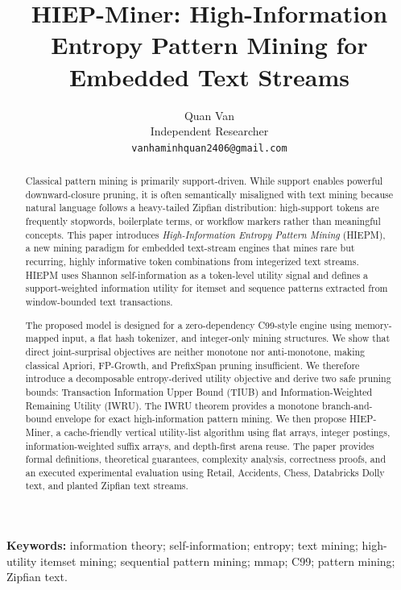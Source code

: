 \documentclass[11pt,a4paper]{article}
\title{\textbf{HIEP-Miner: High-Information Entropy Pattern Mining for Embedded Text Streams}}
\author{
Quan Van\\
Independent Researcher\\
\texttt{vanhaminhquan2406@gmail.com}
}
\date{}
\begin{document}
\maketitle

\begin{abstract}
Classical pattern mining is primarily support-driven. While support enables powerful downward-closure pruning, it is often semantically misaligned with text mining because natural language follows a heavy-tailed Zipfian distribution: high-support tokens are frequently stopwords, boilerplate terms, or workflow markers rather than meaningful concepts. This paper introduces \emph{High-Information Entropy Pattern Mining} (HIEPM), a new mining paradigm for embedded text-stream engines that mines rare but recurring, highly informative token combinations from integerized text streams. HIEPM uses Shannon self-information as a token-level utility signal and defines a support-weighted information utility for itemset and sequence patterns extracted from window-bounded text transactions.

The proposed model is designed for a zero-dependency C99-style engine using memory-mapped input, a flat hash tokenizer, and integer-only mining structures. We show that direct joint-surprisal objectives are neither monotone nor anti-monotone, making classical Apriori, FP-Growth, and PrefixSpan pruning insufficient. We therefore introduce a decomposable entropy-derived utility objective and derive two safe pruning bounds: Transaction Information Upper Bound (TIUB) and Information-Weighted Remaining Utility (IWRU). The IWRU theorem provides a monotone branch-and-bound envelope for exact high-information pattern mining. We then propose HIEP-Miner, a cache-friendly vertical utility-list algorithm using flat arrays, integer postings, information-weighted suffix arrays, and depth-first arena reuse. The paper provides formal definitions, theoretical guarantees, complexity analysis, correctness proofs, and an executed experimental evaluation using Retail, Accidents, Chess, Databricks Dolly text, and planted Zipfian text streams.
\end{abstract}

\noindent\textbf{Keywords:}
information theory; self-information; entropy; text mining; high-utility itemset mining; sequential pattern mining; mmap; C99; pattern mining; Zipfian text.

\end{document}
